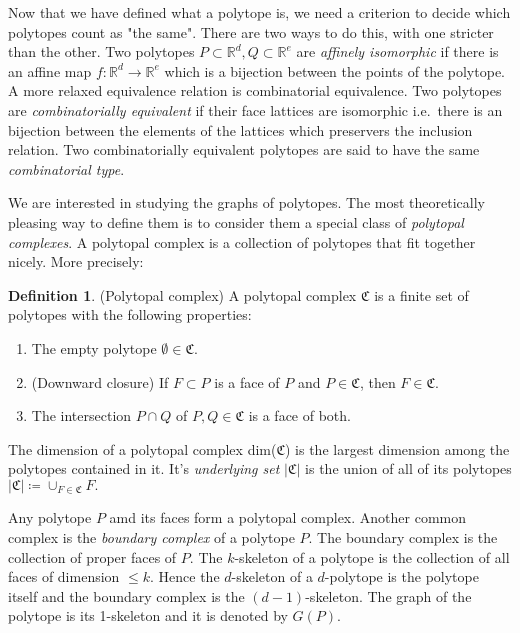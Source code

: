 \documentclass[a4paper,12pt]{book}
\theoremstyle{plain}
\theoremstyle{definition}
\newtheorem{definition}[theorem]{Definition}
\begin{document}
Now that we have defined what a polytope is, we need a criterion to decide which polytopes 
count as "the same". There are two ways to do this, with one stricter than the other.
Two polytopes $P\subset \mathbb{R}^d, Q \subset \mathbb{R}^e$ are 
\textit{affinely isomorphic} if there is an affine map $f: \mathbb{R}^d 
\rightarrow \mathbb{R}^e$ which is a bijection between the points of the 
polytope. A more relaxed equivalence relation is combinatorial equivalence. Two 
polytopes are \textit{combinatorially equivalent} if their face lattices are isomorphic 
i.e.\ there is an bijection between the elements of the lattices which preservers
the inclusion relation. Two combinatorially equivalent polytopes are said to have the 
same \textit{combinatorial type}. 

We are interested in studying the graphs of polytopes. The most theoretically 
pleasing way to define them is to consider them a special class of 
\textit{polytopal complexes}.
A polytopal complex is a collection of polytopes that fit together nicely.
More precisely:
\begin{definition}
 (Polytopal complex) A polytopal complex $\mathfrak{C}$ is a finite set of 
polytopes with the following properties:
\begin{enumerate}
 \item The empty polytope $\emptyset \in \mathfrak{C}$.
  \item (Downward closure) If $F \subset P$ is a face of $P$ and $P \in 
\mathfrak{C}$, then 
$F \in \mathfrak{C}$.
\item The intersection $P\cap Q$ of $P,Q \in \mathfrak{C}$ is a face of both.

\end{enumerate}

\end{definition}

The dimension of a polytopal complex dim($\mathfrak{C}$) is the largest dimension
among the polytopes contained in it. It's \textit{underlying set} $|\mathfrak{C}|$ is the union of all of 
its polytopes $  |\mathfrak{C}| \coloneqq \cup_{F\in \mathfrak{C}} F.$

Any polytope $P$ amd its faces form a polytopal complex. Another common complex is the 
\textit{boundary complex} of a polytope
$P$. The boundary complex is the collection of proper faces of $P$.
The $k$-skeleton of a polytope is the collection of all faces of dimension $\leq 
k$. Hence the $d$-skeleton of a $d$-polytope is the polytope itself and the 
boundary complex is the $(d-1)$-skeleton. The graph of the polytope is its 
1-skeleton and it is denoted by $G(P)$.
\end{document}

